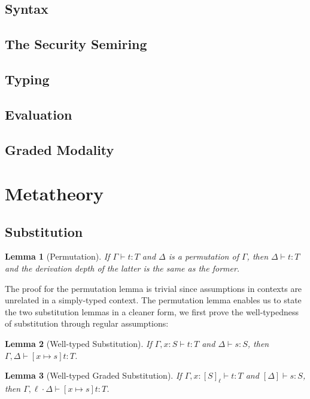 \documentclass[conference]{IEEEtran}
\newtheorem{lemma}{Lemma}
\begin{document}
\subsection{Syntax}

\subsection{The Security Semiring}

\subsection{Typing}

\subsection{Evaluation}

\subsection{Graded Modality}

\section{Metatheory}
\subsection{Substitution}
\begin{lemma}[Permutation]
	If $\Gamma\vdash t:T$ and $\Delta$ is a permutation of $\Gamma$, then $\Delta\vdash t:T$ and the derivation depth of the latter is the same as the former.
\end{lemma}
The proof for the permutation lemma is trivial since assumptions in contexts are unrelated in a simply-typed context. The permutation lemma enables us to state the two substitution lemmas in a cleaner form, we first prove the well-typedness of substitution through regular assumptions:
\begin{lemma}[Well-typed Substitution] 
	If $\Gamma,x:S\vdash t:T$ and $\Delta\vdash s:S$, then $\Gamma,\Delta\vdash [x\mapsto s]t:T$.
\end{lemma}

\begin{lemma}[Well-typed Graded Substitution] 
	If $\Gamma,x:[S]_\ell\vdash t:T$ and $[\Delta]\vdash s:S$, then $\Gamma,\ell\cdot\Delta\vdash [x\mapsto s]t:T$.
\end{lemma}
\end{document}
